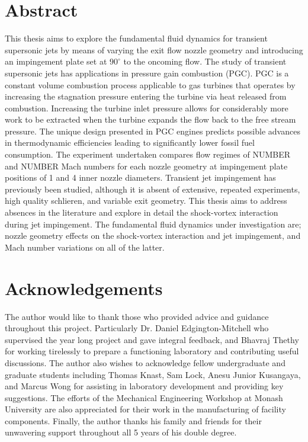 \section*{Abstract}
This thesis aims to explore the fundamental fluid dynamics for transient supersonic jets by means of varying the exit flow nozzle geometry and introducing an impingement plate set at $90^{\circ}$ to the oncoming flow. The study of transient supersonic jets has applications in pressure gain combustion (PGC). PGC is a constant volume combustion process applicable to gas turbines that operates by increasing the stagnation pressure entering the turbine via heat released from combustion. Increasing the turbine inlet pressure allows for considerably more work to be extracted when the turbine expands the flow back to the free stream pressure. The unique design presented in PGC engines predicts 
possible advances in thermodynamic efficiencies leading to significantly lower fossil fuel consumption. The experiment undertaken compares flow regimes of NUMBER and NUMBER Mach numbers for each nozzle geometry at impingement plate positions of 1 and 4 inner nozzle diameters. Transient jet impingement has previously been studied, although it is absent of extensive, repeated experiments, high quality schlieren, and variable exit geometry. This thesis aims to address absences in the literature and explore in detail the shock-vortex interaction during jet impingement. The fundamental fluid dynamics under investigation are; nozzle geometry effects on the shock-vortex interaction and jet impingement, and Mach number variations on all of the latter. 
\newpage
\section*{Acknowledgements}
The author would like to thank those who provided advice and guidance throughout this project. Particularly Dr. Daniel Edgington-Mitchell who supervised the year long project and gave integral feedback, and Bhavraj Thethy for working tirelessly to prepare a functioning laboratory and contributing useful discussions. The author also wishes to acknowledge fellow undergraduate and graduate students including Thomas Knast, Sam Lock, Anesu Junior Kusangaya, and Marcus Wong for assisting in laboratory development and providing key suggestions. The efforts of the Mechanical Engineering Workshop at Monash University are also appreciated for their work in the manufacturing of facility components. Finally, the author thanks his family and friends for their unwavering support throughout all 5 years of his double degree.
\newpage
\tableofcontents
\newpage
\listoftables
\newpage
\listoffigures
\newpage
